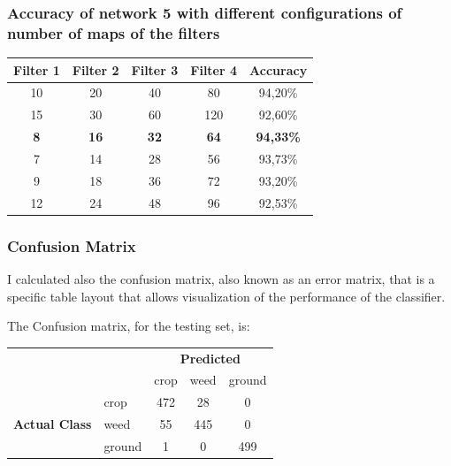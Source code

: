 \documentclass{beamer}
\begin{document}
\begin{frame}
\frametitle{Accuracy of network 5 with different configurations of number of maps of the filters}
\begin{table} [h]
\begin{center}
\begin{tabular}{|c|c|c|c|c|}
 \hline
 \textbf{Filter 1} & \textbf{Filter 2} & \textbf{Filter 3} & \textbf{Filter 4} & \textbf{Accuracy} \\ \hline
 10 & 20 & 40  & 80  & 94,20\%  \\ \hline
 15 & 30 & 60  & 120  & 92,60\%  \\ \hline
 \textbf{8} & \textbf{16} & \textbf{32}  & \textbf{64}  & \textbf{94,33\%}  \\ \hline
 7 & 14 & 28  & 56  & 93,73\%  \\ \hline
 9 & 18 & 36  & 72  & 93,20\%  \\ \hline
 12 & 24 & 48  & 96  & 92,53\%  \\ \hline
 
\end{tabular}
\end{center} 
\end{table}

\end{frame}

\begin{frame}
\frametitle{Confusion Matrix}

I calculated also the confusion matrix, also known as an error matrix, that is a specific table layout that allows visualization of the performance of the classifier.

The Confusion matrix, for the testing set, is:

\begin{table}[h]
\centering

\begin{tabular}{cl|c|c|c|}
\cline{3-5}
\multicolumn{1}{l}{}                                         &        & \multicolumn{3}{c|}{\textbf{Predicted}}                                             \\ \cline{3-5} 
\textbf{}                                                    &        & \multicolumn{1}{l|}{crop} & \multicolumn{1}{l|}{weed} & \multicolumn{1}{l|}{ground} \\ \hline
\multicolumn{1}{|c|}{\multirow{3}{*}{\textbf{Actual Class}}} & crop   & 472                       & 28                        & 0                           \\ \cline{2-5} 
\multicolumn{1}{|c|}{}                                       & weed   & 55                        & 445                       & 0                           \\ \cline{2-5} 
\multicolumn{1}{|c|}{}                                       & ground & 1                         & 0                         & 499                         \\ \hline
\end{tabular}
\end{table} 

\end{frame}
\end{document}

